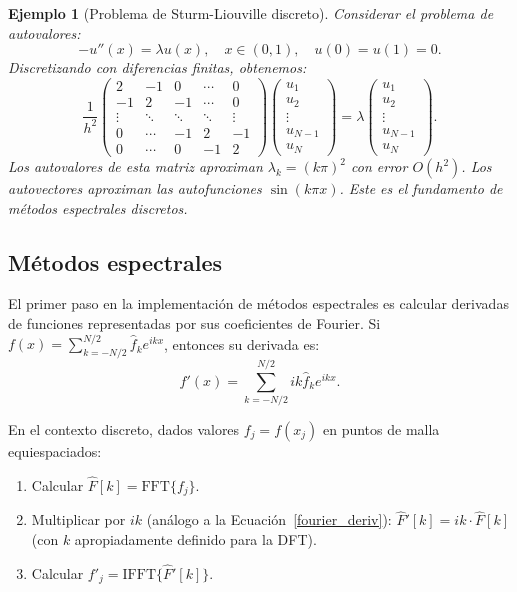 \documentclass[a4paper,11pt]{report}
\newtheorem{example}[theorem]{Ejemplo}
\begin{document}
\begin{example}[Problema de Sturm-Liouville discreto]
Considerar el problema de autovalores:
\[
-u''(x) = \lambda u(x), \quad x \in (0,1), \quad u(0) = u(1) = 0.
\]
Discretizando con diferencias finitas, obtenemos:
\[
\frac{1}{h^2}\begin{pmatrix}
2 & -1 & 0 & \cdots & 0 \\
-1 & 2 & -1 & \cdots & 0 \\
\vdots & \ddots & \ddots & \ddots & \vdots \\
0 & \cdots & -1 & 2 & -1 \\
0 & \cdots & 0 & -1 & 2
\end{pmatrix}
\begin{pmatrix} u_1 \\ u_2 \\ \vdots \\ u_{N-1} \\ u_N \end{pmatrix}
= \lambda \begin{pmatrix} u_1 \\ u_2 \\ \vdots \\ u_{N-1} \\ u_N \end{pmatrix}.
\]
Los autovalores de esta matriz aproximan $\lambda_k = (k\pi)^2$ con error $O(h^2)$. Los autovectores aproximan las autofunciones $\sin(k\pi x)$. Este es el fundamento de métodos espectrales discretos.
\end{example}



\subsection{Métodos espectrales}

El primer paso en la implementación de métodos espectrales es calcular derivadas de funciones representadas por sus coeficientes de Fourier. Si $f(x) = \sum_{k=-N/2}^{N/2} \hat{f}_k e^{ikx}$, entonces su derivada es:
\[
f'(x) = \sum_{k=-N/2}^{N/2} ik \hat{f}_k e^{ikx}.
\]

En el contexto discreto, dados valores $f_j = f(x_j)$ en puntos de malla equiespaciados:
\begin{enumerate}
\item Calcular $\hat{F}[k] = \text{FFT}\{f_j\}$.
\item Multiplicar por $ik$ (análogo a la Ecuación~\eqref{fourier_deriv}): $\hat{F}'[k] = ik \cdot \hat{F}[k]$ (con $k$ apropiadamente definido para la DFT).
\item Calcular $f'_j = \text{IFFT}\{\hat{F}'[k]\}$.
\end{enumerate}
\end{document}
